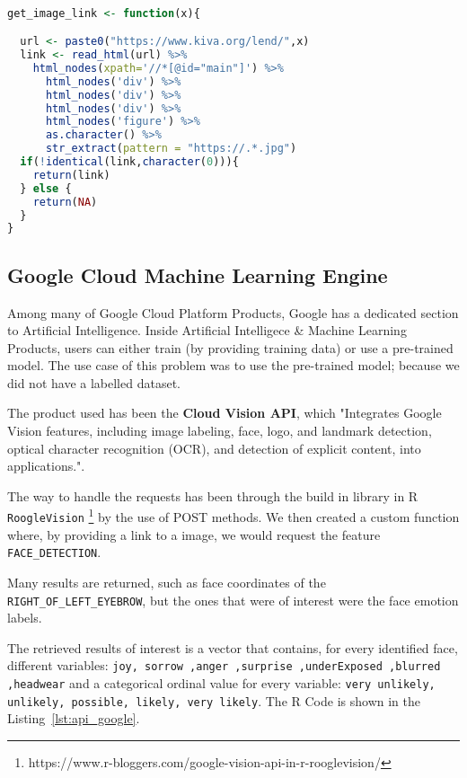 \begin{lstlisting}[language={R}, frame={single}, label={lst:obtainimage}, caption={R Code to obtain a loan image}]

get_image_link <- function(x){

  url <- paste0("https://www.kiva.org/lend/",x) 
  link <- read_html(url) %>%
    html_nodes(xpath='//*[@id="main"]') %>%
      html_nodes('div') %>%
      html_nodes('div') %>%
      html_nodes('div') %>%
      html_nodes('figure') %>%
      as.character() %>%
      str_extract(pattern = "https://.*.jpg") 
  if(!identical(link,character(0))){
    return(link)
  } else {
    return(NA)
  }
}

\end{lstlisting}


\subsection{Google Cloud Machine Learning Engine}
Among many of Google Cloud Platform Products, Google has a dedicated section to Artificial Intelligence. 
Inside Artificial Intelligece \& Machine Learning Products, users can either train (by providing training data) or use a pre-trained model. The use case of this problem was to use the pre-trained model; because we did not have a labelled dataset. \par
The product used has been the \textbf{Cloud Vision API}, which "Integrates Google Vision features, including image labeling, face, logo, and landmark detection, optical character recognition (OCR), and detection of explicit content, into applications.". \par
The way to handle the requests has been through the build in library in R \texttt{RoogleVision} \footnote{https://www.r-bloggers.com/google-vision-api-in-r-rooglevision/} by the use of POST methods.
We then created a custom function where, by providing a link to a image, we would request the feature \texttt{FACE\_DETECTION}. \par
Many results are returned, such as face coordinates of the \texttt{RIGHT\_OF\_LEFT\_EYEBROW}, but the ones that were of interest were the face emotion labels. \par
The retrieved results of interest is a vector that contains, for every identified face, different variables: \texttt{joy, sorrow ,anger ,surprise ,underExposed ,blurred ,headwear} and a categorical ordinal value for every variable: \texttt{very unlikely, unlikely, possible, likely, very likely}.
The R Code is shown in the Listing~\ref{lst:api_google}.

